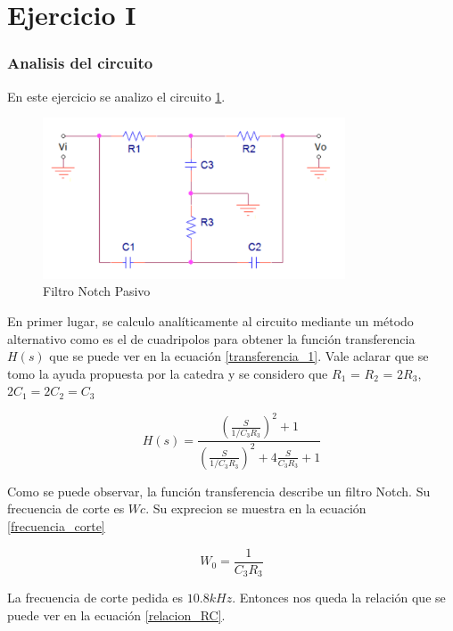 \documentclass[12pt,a4paper]{article}
\begin{document}
\section{Ejercicio I}
\subsubsection{Analisis del circuito}
En este ejercicio se analizo el circuito \ref{fig:circuito_1}. 

\begin{figure}[ht]                                                       
    \centering\includegraphics[width=0.8\textwidth]{circuito_1.png}
    \caption{Filtro Notch Pasivo}
    \label{fig:circuito_1}
    \end{figure}


En primer lugar, se calculo analíticamente al circuito mediante un método alternativo como es el de cuadripolos para
obtener la función transferencia $H(s)$ que se puede ver en la ecuación \ref{transferencia_1}. Vale aclarar que se tomo la ayuda propuesta por la catedra y se considero que $R_{1}$ = $R_{2}$
= $2R_{3}$, $2C_{1} = 2C_{2} = C_{3}$

\begin{equation} H(s) = \frac{(\frac{S}{1/C_{3} R_{3}})^2 + 1} {(\frac{S}{1/C_{3}R_{3}})^2 + 4\frac{S}{C_{3}R_{3}} + 1}  \label{transferencia_1}\end{equation}

Como se puede observar, la función transferencia describe un filtro Notch. Su frecuencia de corte es
$Wc$. Su exprecion se muestra en la ecuación \ref{frecuencia_corte}

\begin{equation} W_{0} =  \frac{1}{C_{3} R_{3}}  \label{frecuencia_corte}\end{equation}

La frecuencia de corte pedida es $10.8k Hz$. Entonces nos queda la relación que se puede ver en la ecuación 
\ref{relacion_RC}.
\end{document}
